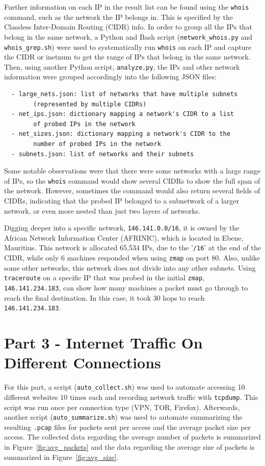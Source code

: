 \documentclass[11pt]{article}
\begin{document}
Further information on each IP in the result list can be found using the \verb|whois| command, such
as the network the IP belongs in. This is specified by the Classless Inter-Domain Routing (CIDR)
info. In order to group all the IPs that belong in the same network, a Python and Bash script 
(\verb|network_whois.py| and \verb|whois_grep.sh|) were used to systematically run \verb|whois|
on each IP and capture the CIDR or inetnum to get the range of IPs that belong in the same network.
Then, using another Python script, \verb|analyze.py|, the IPs and other network information were
grouped accordingly into the following JSON files:
\begin{verbatim}
  - large_nets.json: list of networks that have multiple subnets
        (represented by multiple CIDRs)
  - net_ips.json: dictionary mapping a network's CIDR to a list
        of probed IPs in the network
  - net_sizes.json: dictionary mapping a network's CIDR to the
        number of probed IPs in the network
  - subnets.json: list of networks and their subnets
\end{verbatim}

Some notable observations were that there were some networks with a large range of IPs, so the 
\verb|whois| command would show several CIDRs to show the full span of the network. However,
sometimes the command would also return several fields of CIDRs, indicating that the probed IP
belonged to a subnetwork of a larger network, or even more nested than just two layers of
networks.

Digging deeper into a specific network, \verb|146.141.0.0/16|, it is owned by the African Network 
Information Center (AFRINIC), which is located in Ebene, Mauritius. This network is allocated 65,534
IPs, due to the '\verb|/16|' at the end of the CIDR, while only 6 machines responded when using
\verb|zmap| on port 80. Also, unlike some other networks, this network does not divide into any other
subnets. Using \verb|traceroute| on a specific IP that was probed in the initial \verb|zmap|,
\verb|146.141.234.183|, can show how many machines a packet must go through to reach the final
destination. In this case, it took 30 hops to reach \verb|146.141.234.183|.
\section*{Part 3 - Internet Traffic On Different Connections}
For this part, a script (\verb|auto_collect.sh|) was used to automate accessing 10 different
websites 10 times each and recording network traffic with \verb|tcpdump|. This script was run
once per connection type (VPN, TOR, Firefox). Afterwards, another script (\verb|auto_summarize.sh|)
was used to automate summarizing the resulting \verb|.pcap| files for packets sent per access
and the average packet size per access. The collected data regarding the average number of packets
is summarized in Figure~\ref{fig:avg_packets} and the data regarding the average size of packets
is summarized in Figure~\ref{fig:avg_size}.
\end{document}
